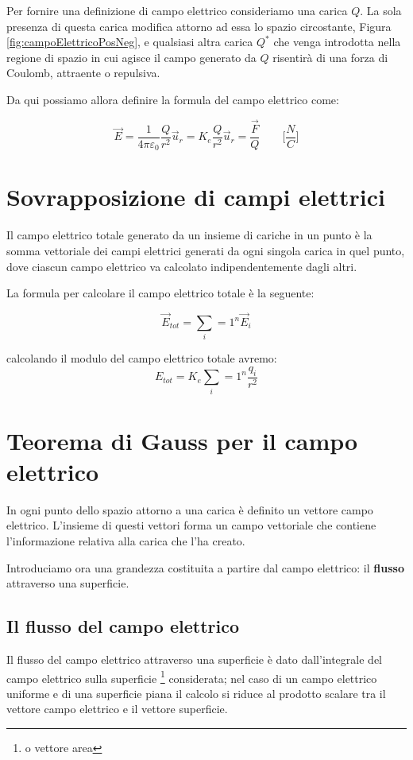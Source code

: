  Per fornire una definizione di campo elettrico consideriamo una carica $Q$. La sola presenza di questa carica modifica attorno ad essa lo spazio circostante, Figura \ref{fig:campoElettricoPosNeg}, e qualsiasi altra carica $Q^*$ che venga introdotta nella regione di spazio in cui agisce il campo generato da $Q$ risentirà di una forza di Coulomb, attraente o repulsiva.
 
 Da qui possiamo allora definire la formula del campo elettrico come:
 
 \begin{equation}
     \vec{E } = \frac{1}{4\pi \varepsilon_0}\frac{Q}{r^2}\vec{u}_r = K_e\frac{Q}{r^2}\vec{u}_r = \frac{\vec{F}}{Q}\qquad\biggl[\frac{N}{C}\biggl]
 \end{equation}
 
 
 \section{Sovrapposizione di campi elettrici}
 Il campo elettrico totale generato da un insieme di cariche in un punto è la
somma vettoriale dei campi elettrici generati da ogni singola carica in quel
punto, dove ciascun campo elettrico va calcolato indipendentemente dagli altri.

La formula per calcolare il campo elettrico totale è la seguente:

\begin{equation}
    \vec{E}_{tot} = \sum_i=1^n \vec{E}_i
\end{equation}

calcolando il modulo del campo elettrico totale avremo:
\begin{equation}
    E_{tot} = K_e\sum_i=1^n \frac{q_i}{r^2}
\end{equation}

\section{Teorema di Gauss per il campo elettrico}
In ogni punto dello spazio attorno a una carica è definito un vettore campo elettrico. L’insieme di questi vettori forma un campo vettoriale che contiene l’informazione relativa alla carica che l’ha creato.

Introduciamo ora una grandezza costituita a partire dal campo elettrico: il \textbf{flusso} attraverso una superficie.

\subsection{Il flusso del campo elettrico}
Il flusso del campo elettrico attraverso una superficie è dato dall'integrale del campo elettrico sulla superficie \footnote{o vettore area} considerata; nel caso di un campo elettrico uniforme e di una superficie piana il calcolo si riduce al prodotto scalare tra il vettore campo elettrico e il vettore superficie.

